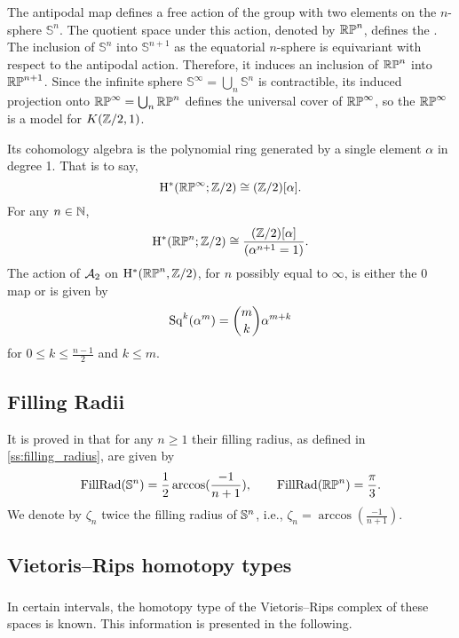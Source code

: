The antipodal map defines a free action of the group with two elements on the $n$-sphere \(\mathbb{S}^n\).
The quotient space under this action, denoted by \(\mathbb{RP}^n\), defines the .
The inclusion of \(\mathbb{S}^n\) into \(\mathbb{S}^{n+1}\) as the equatorial $n$-sphere is equivariant with respect to the antipodal action.
Therefore, it induces an inclusion of \(\mathbb{RP}^n\) into \(\mathbb{RP}^{n+1}\).
Since the infinite sphere \(\mathbb{S}^\infty = \bigcup_n \mathbb{S}^n\) is contractible, its induced projection onto $\mathbb{RP}^\infty = \bigcup_n \mathbb{RP}^n$ defines the universal cover of \(\mathbb{RP}^\infty\), so the  $\mathbb{RP}^\infty$ is a model for \(K(\mathbb{Z}/2, 1)\).

Its cohomology algebra is the polynomial ring generated by a single element $\alpha$ in degree 1.
That is to say,
\[
\mathrm{H}^\ast(\mathbb{RP}^\infty; \mathbb{Z}/2) \cong (\mathbb{Z}/2)[\alpha].
\]
For any $n \in \mathbb{N}$,
\[
\mathrm{H}^\ast(\mathbb{RP}^n; \mathbb{Z}/2) \cong \frac{(\mathbb{Z}/2)[\alpha]}{(\alpha^{n+1} = 1)}.
\]
The action of $\mathcal{A}_2$ on $\mathrm{H}^*(\mathbb{RP}^n, \mathbb{Z}/2)$, for $n$ possibly equal to $\infty$, is either the 0 map or is given by
\[
\operatorname{Sq}^k(\alpha^m) = \binom{m}{k}\alpha^{m+k}
\]
for $0 \leq k \leq \frac{n-1}{2}$ and $k \leq m$.

\subsection{Filling Radii}

It is proved in \cite{katz1983filling} that for any $n \geq 1$ their filling radius, as defined in \cref{ss:filling_radius}, are given by
\[
\operatorname{FillRad}(\mathbb{S}^n) = \frac{1}{2}\arccos(\frac{-1}{n+1}), \qquad
\operatorname{FillRad}(\mathbb{RP}^n) = \frac{\pi}{3}.
\]
We denote by $\zeta_n$ twice the filling radius of $\mathbb{S}^n$, i.e., $\zeta_n = \arccos(\frac{-1}{n+1})$.

\subsection{Vietoris--Rips homotopy types}

\subsubsection{} In certain intervals, the homotopy type of the Vietoris--Rips complex of these spaces is known.
This information is presented in the following.


